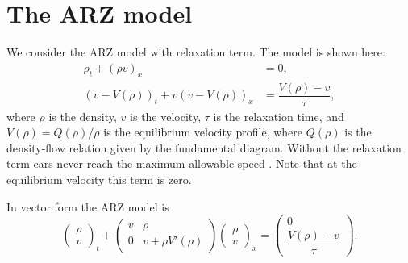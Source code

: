 \documentclass[preprint]{elsarticle}
\begin{document}
\section{The ARZ model}


We consider the ARZ model with relaxation term. The model is shown here: 
\begin{align} 
\rho_t + (\rho v)_x &= 0, \label{ARZ1} \\
(v - V(\rho))_t + v(v - V(\rho))_x &=\dfrac{V(\rho) - v}{\tau} \label{ARZ2},
\end{align}
where $\rho$ is the density, $v$ is the velocity, $\tau$ is the relaxation time, and $V(\rho) = Q(\rho)/\rho$ is the equilibrium velocity profile, where $Q(\rho)$ is the density-flow relation given by the fundamental diagram. Without the relaxation term cars never reach the maximum allowable speed \cite{R_improved}. Note that at the equilibrium velocity this term is zero. 

In vector form the ARZ model is
\begin{equation} \label{ARZrhov}
\begin{pmatrix}
\rho \\ v
\end{pmatrix}_t
+ \begin{pmatrix}
v & \rho \\
0 & v + \rho V' (\rho)
\end{pmatrix}
\begin{pmatrix}
\rho \\ v
\end{pmatrix}_x = 
\begin{pmatrix}
0 \\ \dfrac{V(\rho) - v}{\tau}
\end{pmatrix}.
\end{equation}
\end{document}

